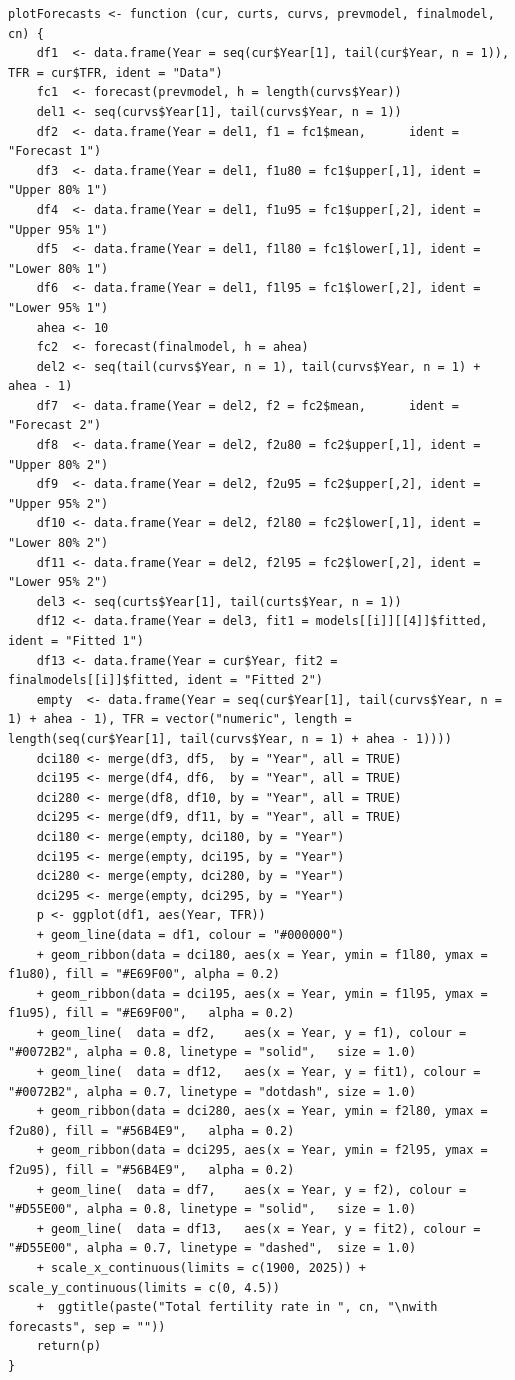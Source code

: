 \documentclass[a4paper, 12pt]{scrartcl}
\begin{document}
\begin{lstlisting}[caption={A file containing some helpful functions, mostly for creating pretty plots.}]
plotForecasts <- function (cur, curts, curvs, prevmodel, finalmodel, cn) {
	df1  <- data.frame(Year = seq(cur$Year[1], tail(cur$Year, n = 1)), TFR = cur$TFR, ident = "Data")
	fc1  <- forecast(prevmodel, h = length(curvs$Year))
	del1 <- seq(curvs$Year[1], tail(curvs$Year, n = 1))
	df2  <- data.frame(Year = del1, f1 = fc1$mean,      ident = "Forecast 1")
	df3  <- data.frame(Year = del1, f1u80 = fc1$upper[,1], ident = "Upper 80% 1")
	df4  <- data.frame(Year = del1, f1u95 = fc1$upper[,2], ident = "Upper 95% 1")
	df5  <- data.frame(Year = del1, f1l80 = fc1$lower[,1], ident = "Lower 80% 1")
	df6  <- data.frame(Year = del1, f1l95 = fc1$lower[,2], ident = "Lower 95% 1")
	ahea <- 10
	fc2  <- forecast(finalmodel, h = ahea)
	del2 <- seq(tail(curvs$Year, n = 1), tail(curvs$Year, n = 1) + ahea - 1)
	df7  <- data.frame(Year = del2, f2 = fc2$mean,      ident = "Forecast 2")
	df8  <- data.frame(Year = del2, f2u80 = fc2$upper[,1], ident = "Upper 80% 2")
	df9  <- data.frame(Year = del2, f2u95 = fc2$upper[,2], ident = "Upper 95% 2")
	df10 <- data.frame(Year = del2, f2l80 = fc2$lower[,1], ident = "Lower 80% 2")
	df11 <- data.frame(Year = del2, f2l95 = fc2$lower[,2], ident = "Lower 95% 2")
	del3 <- seq(curts$Year[1], tail(curts$Year, n = 1))
	df12 <- data.frame(Year = del3, fit1 = models[[i]][[4]]$fitted, ident = "Fitted 1")
	df13 <- data.frame(Year = cur$Year, fit2 = finalmodels[[i]]$fitted, ident = "Fitted 2")
	empty  <- data.frame(Year = seq(cur$Year[1], tail(curvs$Year, n = 1) + ahea - 1), TFR = vector("numeric", length = length(seq(cur$Year[1], tail(curvs$Year, n = 1) + ahea - 1))))
	dci180 <- merge(df3, df5,  by = "Year", all = TRUE)
	dci195 <- merge(df4, df6,  by = "Year", all = TRUE)
	dci280 <- merge(df8, df10, by = "Year", all = TRUE)
	dci295 <- merge(df9, df11, by = "Year", all = TRUE)
	dci180 <- merge(empty, dci180, by = "Year")
	dci195 <- merge(empty, dci195, by = "Year")
	dci280 <- merge(empty, dci280, by = "Year")
	dci295 <- merge(empty, dci295, by = "Year")
	p <- ggplot(df1, aes(Year, TFR))
	+ geom_line(data = df1, colour = "#000000")
	+ geom_ribbon(data = dci180, aes(x = Year, ymin = f1l80, ymax = f1u80), fill = "#E69F00", alpha = 0.2) 
	+ geom_ribbon(data = dci195, aes(x = Year, ymin = f1l95, ymax = f1u95), fill = "#E69F00",   alpha = 0.2)
	+ geom_line(  data = df2,    aes(x = Year, y = f1), colour = "#0072B2", alpha = 0.8, linetype = "solid",   size = 1.0) 
	+ geom_line(  data = df12,   aes(x = Year, y = fit1), colour = "#0072B2", alpha = 0.7, linetype = "dotdash", size = 1.0)
	+ geom_ribbon(data = dci280, aes(x = Year, ymin = f2l80, ymax = f2u80), fill = "#56B4E9",   alpha = 0.2) 
	+ geom_ribbon(data = dci295, aes(x = Year, ymin = f2l95, ymax = f2u95), fill = "#56B4E9",   alpha = 0.2)
	+ geom_line(  data = df7,    aes(x = Year, y = f2), colour = "#D55E00", alpha = 0.8, linetype = "solid",   size = 1.0) 
	+ geom_line(  data = df13,   aes(x = Year, y = fit2), colour = "#D55E00", alpha = 0.7, linetype = "dashed",  size = 1.0)
	+ scale_x_continuous(limits = c(1900, 2025)) + scale_y_continuous(limits = c(0, 4.5))
	+  ggtitle(paste("Total fertility rate in ", cn, "\nwith forecasts", sep = ""))
	return(p)
}
\end{lstlisting}
\end{document}
